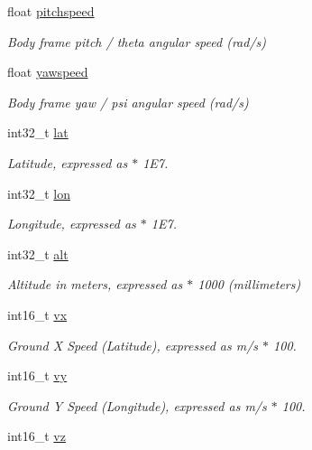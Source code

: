\begin{DoxyCompactItemize}
float \hyperlink{struct____mavlink__hil__state__t_ad7d8b42ee6698e6f892c20146f954d5a}{pitchspeed}
\begin{DoxyCompactList}\small\item\em Body frame pitch / theta angular speed (rad/s) \end{DoxyCompactList}\item 
float \hyperlink{struct____mavlink__hil__state__t_a50f16fd863e535867c95fabcfef2e498}{yawspeed}
\begin{DoxyCompactList}\small\item\em Body frame yaw / psi angular speed (rad/s) \end{DoxyCompactList}\item 
int32\+\_\+t \hyperlink{struct____mavlink__hil__state__t_afb2b29710c1a8b69503e35a72473c6d3}{lat}
\begin{DoxyCompactList}\small\item\em Latitude, expressed as $\ast$ 1\+E7. \end{DoxyCompactList}\item 
int32\+\_\+t \hyperlink{struct____mavlink__hil__state__t_aeac8427298a17d090889edf71a21c6ac}{lon}
\begin{DoxyCompactList}\small\item\em Longitude, expressed as $\ast$ 1\+E7. \end{DoxyCompactList}\item 
int32\+\_\+t \hyperlink{struct____mavlink__hil__state__t_a8f4ac2f2f4948df71b4abbb50d7c2f2f}{alt}
\begin{DoxyCompactList}\small\item\em Altitude in meters, expressed as $\ast$ 1000 (millimeters) \end{DoxyCompactList}\item 
int16\+\_\+t \hyperlink{struct____mavlink__hil__state__t_a8ea365258210e69427e6c02f82aa710c}{vx}
\begin{DoxyCompactList}\small\item\em Ground X Speed (Latitude), expressed as m/s $\ast$ 100. \end{DoxyCompactList}\item 
int16\+\_\+t \hyperlink{struct____mavlink__hil__state__t_a8d3234cf343035ab3f240f23fac95072}{vy}
\begin{DoxyCompactList}\small\item\em Ground Y Speed (Longitude), expressed as m/s $\ast$ 100. \end{DoxyCompactList}\item 
int16\+\_\+t \hyperlink{struct____mavlink__hil__state__t_add6c834de56047ff2316d059b741cce0}{vz}

\end{DoxyCompactItemize}
